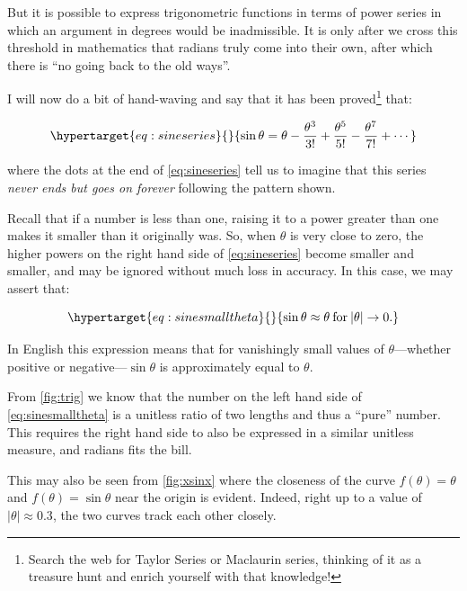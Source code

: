 \documentclass[
  a4paper,
]{article}
\begin{document}
But it is possible to express trigonometric functions in terms of power
series in which an argument in degrees would be inadmissible. It is only
after we cross this threshold in mathematics that radians truly come
into their own, after which there is ``no going back to the old ways''.

I will now do a bit of hand-waving and say that it has been
proved\footnote{Search the web for Taylor Series or Maclaurin series,
  thinking of it as a treasure hunt and enrich yourself with that
  knowledge!} that:

\begin{equation}\protect\hypertarget{eq:sineseries}{}{
\sin\theta = \theta - \frac{\theta^3}{3!} + \frac{\theta^5}{5!} - \frac{\theta^7}{7!} + \cdots
}\label{eq:sineseries}\end{equation}

where the dots at the end of \cref{eq:sineseries} tell us to imagine
that this series \emph{never ends but goes on forever} following the
pattern shown.

Recall that if a number is less than one, raising it to a power greater
than one makes it smaller than it originally was. So, when \(\theta\) is
very close to zero, the higher powers on the right hand side of
\cref{eq:sineseries} become smaller and smaller, and may be ignored
without much loss in accuracy. In this case, we may assert that:

\begin{equation}\protect\hypertarget{eq:sinesmalltheta}{}{
\sin\theta\approx\theta \:\text{for}\: \lvert\theta\rvert \to 0.
}\label{eq:sinesmalltheta}\end{equation}

In English this expression means that for vanishingly small values of
\(\theta\)---whether positive or negative---\(\sin\theta\) is
approximately equal to \(\theta\).

From \cref{fig:trig} we know that the number on the left hand side of
\cref{eq:sinesmalltheta} is a unitless ratio of two lengths and thus a
``pure'' number. This requires the right hand side to also be expressed
in a similar unitless measure, and radians fits the bill.

This may also be seen from \cref{fig:xsinx} where the closeness of the
curve \(f(\theta) = \theta\) and \(f(\theta) = \sin\theta\) near the
origin is evident. Indeed, right up to a value of
\(\lvert\theta\rvert\approx 0.3\), the two curves track each other
closely.
\end{document}
